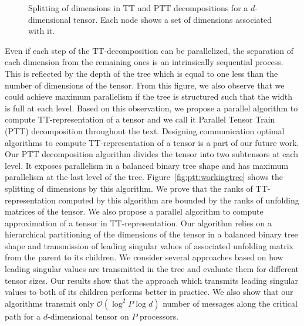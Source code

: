 \documentclass[sigconf]{acmart}
\begin{document}
\begin{figure*}[!t]
\begin{center}
{
		}
		\caption{Splitting of dimensions in TT and PTT decompositions for a $d$-dimensional tensor. Each node shows a set of dimensions associated with it.~\label{fig:tt:ptt}}
	\end{center}
\end{figure*} 
Even if each step of the TT-decomposition can be parallelized, the separation of each dimension from the remaining ones is an intrinsically sequential process. This is reflected by the depth of the tree which is equal to one less than the number of dimensions of the tensor. From this figure, we also observe that we could achieve maximum parallelism if the tree is structured such that the width is full at each level. Based on this observation, we propose a parallel algorithm to compute TT-representation of a tensor and we call it Parallel Tensor Train (PTT) decomposition throughout the text. Designing communication optimal algorithms to compute TT-representation of a tensor is a part of our future work. Our PTT decomposition algorithm divides the tensor into two subtensors at each level. It exposes parallelism in a balanced binary tree shape and has maximum parallelism at the last level of the tree. Figure~\ref{fig:ptt:workingtree} shows the splitting of dimensions by this algorithm. We prove that the ranks of TT-representation computed by this algorithm are bounded by the ranks of unfolding matrices of the tensor. We also propose a parallel algorithm to compute approximation of a tensor in TT-representation. Our algorithm relies on a hierarchical partitioning of the dimensions of the tensor in a balanced binary tree shape and transmission of leading singular values of associated unfolding matrix from the parent to its children. We consider several approaches based on how leading singular values are transmitted in the tree and  evaluate them for different tensor sizes. Our results show that the approach which transmits leading singular values to both of its children performs better in practice. We also show that our algorithms transmit only $\mathcal{O}(\log^2 P\log d)$ number of messages along the critical path for a $d$-dimensional tensor on $P$ processors.
\end{document}
